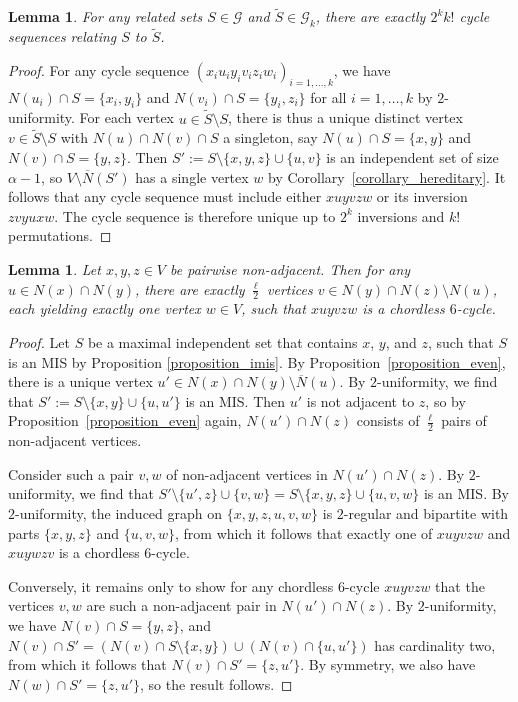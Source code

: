 \documentclass{article}
\theoremstyle{plain}
\theoremstyle{remark}
\theoremstyle{plain}
\newtheorem{lemma}[theorem]{Lemma}
\numberwithin{equation}{section}
\begin{document}
	\begin{lemma}\label{lemma_sequences}
		For any related sets $S\in\mathcal{G}$ and $\widetilde{S}\in\mathcal{G}_k$, there are exactly $2^kk!$ cycle sequences relating $S$ to $\widetilde{S}$.
	\end{lemma}
	
	\begin{proof}
		For any cycle sequence $(x_iu_iy_iv_iz_iw_i)_{i=1,\ldots,k}$, we have $N(u_i)\cap S=\{x_i,y_i\}$ and $N(v_i)\cap S=\{y_i,z_i\}$ for all $i=1,\ldots,k$ by $2$-uniformity. For each vertex $u\in\widetilde{S}\setminus S$, there is thus a unique distinct vertex $v\in\widetilde{S}\setminus S$ with $N(u)\cap N(v)\cap S$ a singleton, say $N(u)\cap S=\{x,y\}$ and $N(v)\cap S=\{y,z\}$. Then $S':=S\setminus\{x,y,z\}\cup\{u,v\}$ is an independent set of size $\alpha-1$, so $V\setminus\overline{N}(S')$ has a single vertex $w$ by Corollary~\ref{corollary_hereditary}. It follows that any cycle sequence must include either $xuyvzw$ or its inversion $zvyuxw$. The cycle sequence is therefore unique up to $2^k$ inversions and $k!$ permutations.
	\end{proof}
	
	\begin{lemma}\label{lemma_cycle}
		Let $x,y,z\in V$ be pairwise non-adjacent. Then for any $u\in N(x)\cap N(y)$, there are exactly $\tfrac{\ell}{2}$ vertices $v\in N(y)\cap N(z)\setminus N(u)$, each yielding exactly one vertex $w\in V$, such that $xuyvzw$ is a chordless $6$-cycle.
	\end{lemma}
	
	\begin{proof}
		Let $S$ be a maximal independent set that contains $x$, $y$, and $z$, such that $S$ is an MIS by Proposition \ref{proposition_imis}. By Proposition~\ref{proposition_even}, there is a unique vertex $u'\in N(x)\cap N(y)\setminus\overline{N}(u)$. By $2$-uniformity, we find that $S':=S\setminus\{x,y\}\cup\{u,u'\}$ is an MIS. Then $u'$ is not adjacent to $z$, so by Proposition~\ref{proposition_even} again, $N(u')\cap N(z)$ consists of $\frac{\ell}{2}$ pairs of non-adjacent vertices.
		
		Consider such a pair $v,w$ of non-adjacent vertices in $N(u')\cap N(z)$. By $2$-uniformity, we find that $S'\setminus\{u',z\}\cup\{v,w\}=S\setminus\{x,y,z\}\cup\{u,v,w\}$ is an MIS. By $2$-uniformity, the induced graph on $\{x,y,z,u,v,w\}$ is $2$-regular and bipartite with parts $\{x,y,z\}$ and $\{u,v,w\}$, from which it follows that exactly one of $xuyvzw$ and $xuywzv$ is a chordless $6$-cycle.
		
		Conversely, it remains only to show for any chordless $6$-cycle $xuyvzw$ that the vertices $v,w$ are such a non-adjacent pair in $N(u')\cap N(z)$. By $2$-uniformity, we have $N(v)\cap S=\{y,z\}$, and $N(v)\cap S'=(N(v)\cap S\setminus\{x,y\})\cup(N(v)\cap\{u,u'\})$ has cardinality two, from which it follows that $N(v)\cap S'=\{z,u'\}$. By symmetry, we also have $N(w)\cap S'=\{z,u'\}$, so the result follows.
	\end{proof}
	
\end{document}
